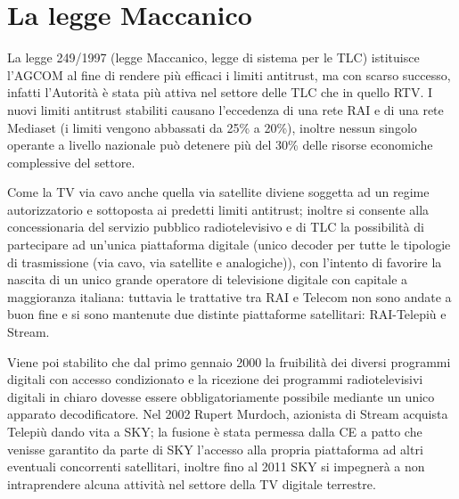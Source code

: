 \section{La legge Maccanico}

La legge 249/1997 (legge Maccanico, legge di sistema per le TLC) istituisce l’AGCOM al fine di rendere più efficaci i limiti antitrust, ma con scarso successo, infatti l’Autorità è stata più attiva nel settore delle TLC che in quello RTV. I nuovi limiti antitrust stabiliti causano l’eccedenza di una rete RAI e di una rete Mediaset (i limiti vengono abbassati da 25\% a 20\%), inoltre nessun singolo operante a livello nazionale può detenere più del 30\% delle risorse economiche complessive del settore.


Come la TV via cavo anche quella via satellite diviene soggetta ad un regime autorizzatorio e sottoposta ai predetti limiti antitrust; inoltre si consente alla concessionaria del servizio pubblico radiotelevisivo e di TLC la possibilità di partecipare ad un’unica piattaforma digitale (unico decoder per tutte le tipologie di trasmissione (via cavo, via satellite e analogiche)), con l’intento di favorire la nascita di un unico grande operatore di televisione digitale con capitale a maggioranza italiana: tuttavia le trattative tra RAI e Telecom non sono andate a buon fine e si sono mantenute due distinte piattaforme satellitari: RAI-Telepiù e Stream. 


Viene poi stabilito che dal primo gennaio 2000 la fruibilità dei diversi programmi digitali con accesso condizionato e la ricezione dei programmi radiotelevisivi digitali in chiaro dovesse essere obbligatoriamente possibile mediante un unico apparato decodificatore. Nel 2002 Rupert Murdoch, azionista di Stream acquista Telepiù dando vita a SKY; la fusione è stata permessa dalla CE a patto che venisse garantito da parte di SKY l’accesso alla propria piattaforma ad altri eventuali concorrenti satellitari, inoltre fino al 2011 SKY si impegnerà a non intraprendere alcuna attività nel settore
della TV digitale terrestre.